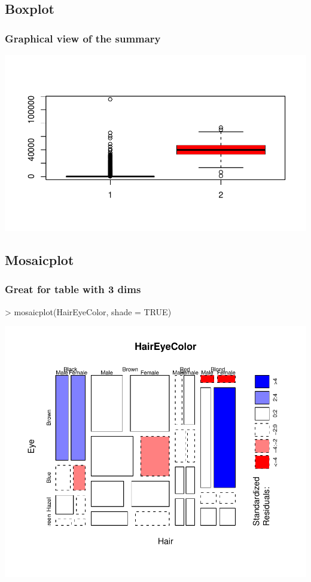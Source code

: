 \subsection{Boxplot}

\begin{frame}
  \frametitle{Graphical view of the summary}
\begin{Schunk}
\end{Schunk}
\includegraphics{plots/figura-029}
\end{frame}


\subsection{Mosaicplot}

\begin{frame}
  \frametitle{Great for table with 3 dims}
\begin{Schunk}
\begin{Sinput}
> mosaicplot(HairEyeColor, shade = TRUE)
\end{Sinput}
\end{Schunk}
\includegraphics{plots/figura-030}
\end{frame}

